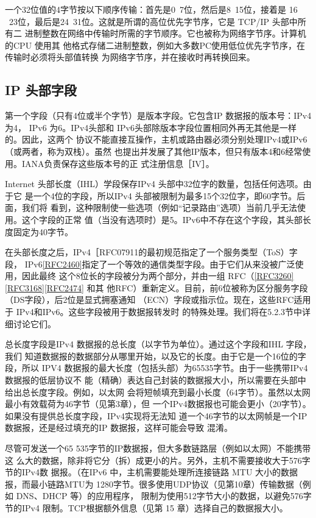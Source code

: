 一个32位值的4字节按以下顺序传输：首先是0~7位，然后是8~15位，接着是
16 ~23位，最后是24~31位。这就是所谓的高位优先字节序，它是 TCP/IP 头部中所有二
进制整数在网络中传输时所需的字节顺序。它也被称为网络字节序。计算机的CPU 使用其
他格式存储二进制整数，例如大多数PC使用低位优先字节序，在传输时必须将头部值转换
为网络字节序，并在接收时再转换回来。

\subsection{IP 头部字段}
第一个字段（只有4位或半个字节）是版本字段。它包含IP 数据报的版本号：IPv4 为4，
IPv6 为6。IPv4头部和 IPv6头部除版本字段位置相同外再无其他是一样的。因此，这两个
协议不能直接互操作，主机或路由器必须分别处理IPv4或IPv6（或两者，称为双栈）。虽然
也提出并发展了其他IP版本，但只有版本4和6经常使用。IANA负责保存这些版本号的正
式注册信息［IV］。

Internet 头部长度（IHL）学段保存IPv4 头部中32位字的数量，包括任何选项。由于它
是一个4位的字段，所以IPv4 头部被限制为最多15个32位字，即60字节。后面，我们将
看到，这种限制使一些选项（例如“记录路由”选项）当前几乎无法使用。这个字段的正常
值（当没有选项时）是5。IPv6中不存在这个字段，其头部长度固定为40字节。

在头部长度之后，IPv4［RFC07911的最初规范指定了一个服务类型（ToS）字段，
IPv6\href{https://www.rfc-editor.org/rfc/rfc2460}{[RFC2460]}指定了一个等效的通信类型字段。由于它们从来没被广泛使用，因此最终
这个8位长的字段被分为两个部分，并由一组
RFC（\href{https://www.rfc-editor.org/rfc/rfc3260}{[RFC3260]}\href{https://www.rfc-editor.org/rfc/rfc3168}{[RFC3168]}\href{https://www.rfc-editor.org/rfc/rfc2474}{[RFC2474]}
和其
他RFC）重新定义。目前，前6位被称为区分服务字段（DS字段），后2位是显式拥塞通知
（ECN）字段或指示位。现在，这些RFC适用于 IPv4和IPv6。这些字段被用于数据报转发时
的特殊处理。我们将在5.2.3节中详细讨论它们。

总长度字段是IPv4 数据报的总长度（以字节为单位）。通过这个字段和IHL 字段，我们
知道数据报的数据部分从哪里开始，以及它的长度。由于它是一个16位的字段，所以 IPV4
数据报的最大长度（包括头部）为65535字节。由于一些携带IPv4 数据报的低层协议不
能（精确）表达自己封装的数据报大小，所以需要在头部中给出总长度字段。例如，以太网
会将短帧填充到最小长度（64字节）。虽然以太网最小有效载荷为46字节（见第3章），但
一个IPv4数据报也可能会更小（20字节）。如果没有提供总长度字段，IPv4实现将无法知
道一个46字节的以太网帧是一个IP数据报，还是经过填充的IP 数据报，这样可能会导致
混淆。

尽管可发送一个65 535字节的IP数据报，但大多数链路层（例如以太网）不能携带这
么大的数据，除非将它分（拆）成更小的片。另外，主机不需要接收大于576字节的IPv4数
据报。（在IPv6 中，主机需要能处理所连接链路 MTU 大小的数据报，而最小链路MTU为
1280字节。很多使用UDP协议（见第10章）传输数据（例如 DNS、DHCP 等）的应用程序，
限制为使用512字节大小的数据，以避免576字节的IPv4 限制。TCP根据额外信息（见第
15 章）选择自己的数据报大小。

